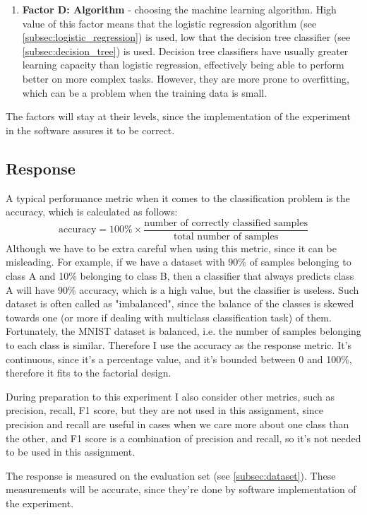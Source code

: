 \documentclass{article}
\begin{document}
\begin{enumerate}
    \item \textbf{Factor D: Algorithm} - choosing the machine learning algorithm. High value of this factor means that the logistic regression algorithm (see \ref{subsec:logistic_regression}) is used, low that the decision tree classifier (see \ref{subsec:decision_tree}) is used. Decision tree classifiers have usually greater learning capacity than logistic regression, effectively being able to perform better on more complex tasks. However, they are more prone to overfitting, which can be a problem when the training data is small.
\end{enumerate}

The factors will stay at their levels, since the implementation of the experiment in the software assures it to be correct.

\subsection{Response}
A typical performance metric when it comes to the classification problem is the accuracy, which is calculated as follows:
\begin{equation}
    \text{accuracy} = 100\%\times\frac{\text{number of correctly classified samples}}{\text{total number of samples}}
\end{equation}
Although we have to be extra careful when using this metric, since it can be misleading. For example, if we have a dataset with 90\% of samples belonging to class A and 10\% belonging to class B, then a classifier that always predicts class A will have 90\% accuracy, which is a high value, but the classifier is useless. Such dataset is often called as "imbalanced", since the balance of the classes is skewed towards one (or more if dealing with multiclass classification task) of them. Fortunately, the MNIST dataset is balanced, i.e. the number of samples belonging to each class is similar. Therefore I use the accuracy as the response metric. It's continuous, since it's a percentage value, and it's bounded between 0 and 100\%, therefore it fits to the factorial design.

During preparation to this experiment I also consider other metrics, such as precision, recall, F1 score, but they are not used in this assignment, since precision and recall are useful in cases when we care more about one class than the other, and F1 score is a combination of precision and recall, so it's not needed to be used in this assignment.

The response is measured on the evaluation set (see \ref{subsec:dataset}). These measurements will be accurate, since they're done by software implementation of the experiment.
\end{document}
